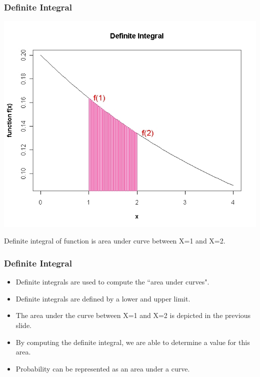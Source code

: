 \begin{frame}
\frametitle{Definite Integral}

\vspace{-0.5cm}
\begin{center}
\includegraphics[scale=0.35]{6ADefiniteIntegral}
\end{center}
Definite integral of function is area under curve between X=1 and X=2.
\end{frame}
\begin{frame}
\frametitle{Definite Integral}
\begin{itemize}
\item Definite integrals are used to compute the ``area under curves".
\item Definite integrals are defined by a lower and upper limit.
\item The area under the curve between X=1 and  X=2 is depicted in the previous slide.
\item By computing the definite integral, we are able to determine a value for this area.
\item Probability can be represented as an area under a curve.
\end{itemize}
\end{frame}

